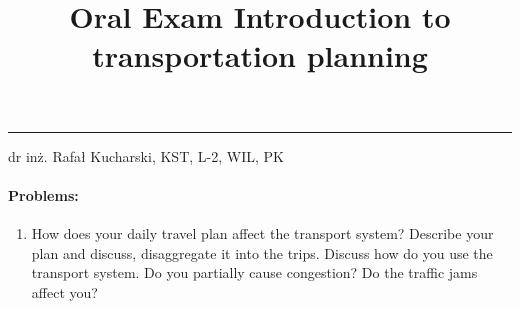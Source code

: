 \documentclass[11pt,a4paper]{article}
\date{\vspace{-14ex}}
\begin{document}
\title{\Large \textbf{Oral Exam} Introduction to transportation planning}
\maketitle
\noindent\rule{16.9cm}{1pt}
\vspace{-3mm}
 \begin{flushright}
dr inż. Rafał Kucharski, KST, L-2, WIL, PK
\end{flushright}

\paragraph{Problems:}
\begin{enumerate}
\item How does your daily travel plan affect the transport system? Describe your plan and discuss, disaggregate it into the trips. Discuss how do you use the transport system. Do you partially cause congestion? Do the traffic jams affect you? 


\end{enumerate}
\end{document}
